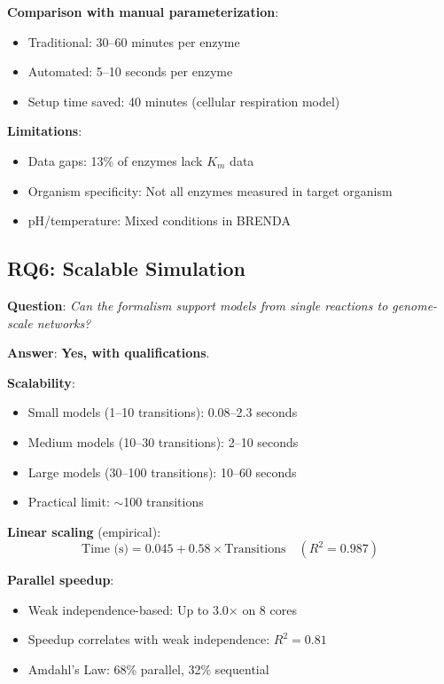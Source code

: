 \textbf{Comparison with manual parameterization}:
\begin{itemize}
    \item Traditional: 30--60 minutes per enzyme
    \item Automated: 5--10 seconds per enzyme
    \item Setup time saved: 40 minutes (cellular respiration model)
\end{itemize}

\textbf{Limitations}:
\begin{itemize}
    \item Data gaps: 13\% of enzymes lack $K_m$ data
    \item Organism specificity: Not all enzymes measured in target organism
    \item pH/temperature: Mixed conditions in BRENDA
\end{itemize}

\subsection{RQ6: Scalable Simulation}
\label{subsec:rq6}

\textbf{Question}: \textit{Can the formalism support models from single reactions to genome-scale networks?}

\textbf{Answer}: \textbf{Yes, with qualifications}.

\textbf{Scalability}:
\begin{itemize}
    \item Small models (1--10 transitions): 0.08--2.3 seconds
    \item Medium models (10--30 transitions): 2--10 seconds
    \item Large models (30--100 transitions): 10--60 seconds
    \item Practical limit: $\sim$100 transitions
\end{itemize}

\textbf{Linear scaling} (empirical):
\begin{equation}
\text{Time (s)} = 0.045 + 0.58 \times \text{Transitions} \quad (R^2 = 0.987)
\end{equation}

\textbf{Parallel speedup}:
\begin{itemize}
    \item Weak independence-based: Up to 3.0$\times$ on 8 cores
    \item Speedup correlates with weak independence: $R^2 = 0.81$
    \item Amdahl's Law: 68\% parallel, 32\% sequential
\end{itemize}

